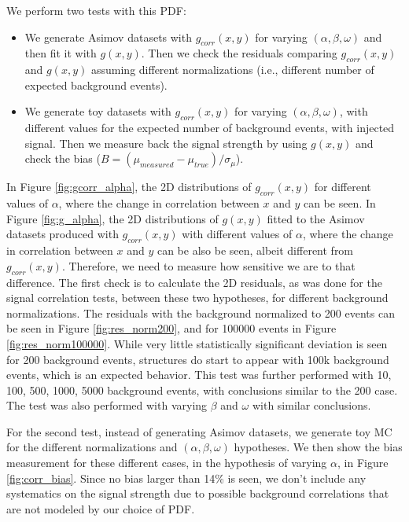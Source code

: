 We perform two tests with this PDF: 
\begin{itemize}
\item We generate Asimov datasets \cite{asimov_dataset} with $g_{corr}(x,y)$ for varying $(\alpha,\beta,\omega)$ and then fit it with $g(x,y)$. Then we check the residuals comparing $g_{corr}(x,y)$ and $g(x,y)$ assuming different normalizations (i.e., different number of expected background events).
\item We generate toy datasets with  $g_{corr}(x,y)$ for varying $(\alpha,\beta,\omega)$, with different values for the expected number of background events, with injected signal. Then we measure back the signal strength by using $g(x,y)$ and check the bias ($B = (\mu_{measured} - \mu_{true})/\sigma_{\mu}$).
\end{itemize}

In Figure \ref{fig:gcorr_alpha}, the 2D distributions of $g_{corr}(x,y)$ for different values of $\alpha$, where the change in correlation between $x$ and $y$ can be seen.  
In Figure \ref{fig:g_alpha}, the 2D distributions of $g(x,y)$ fitted to the Asimov datasets produced with  $g_{corr}(x,y)$ with different values of $\alpha$, where the change in correlation between $x$ and $y$ can be also be seen, albeit different from $g_{corr}(x,y)$. Therefore, we need to measure how sensitive we are to that difference. 
The first check is to calculate the 2D residuals, as was done for the signal correlation tests, between these two hypotheses, for different background normalizations. 
The residuals with the background normalized to 200 events can be seen in Figure \ref{fig:res_norm200}, and for 100000 events in Figure \ref{fig:res_norm100000}. 
While very little statistically significant deviation is seen for 200 background events, structures do start to appear with 100k background events, which is an expected behavior. 
This test was further performed with 10, 100, 500, 1000, 5000 background events, with conclusions similar to the 200 case. 
The test was also performed with varying $\beta$ and $\omega$ with similar conclusions. 

For the second test, instead of generating Asimov datasets, we generate toy MC for the different normalizations and $(\alpha,\beta,\omega)$ hypotheses. 
We then show the bias measurement for these different cases, in the hypothesis of varying $\alpha$, in Figure \ref{fig:corr_bias}. 
Since no bias larger than 14\% is seen, we don't include any systematics on the signal strength due to possible background correlations that are not modeled by our choice of PDF.


